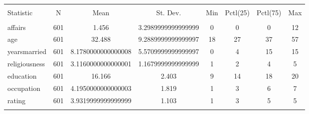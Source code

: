 
\begin{table}[!htbp] \centering 
  \caption{} 
  \label{} 
\begin{tabular}{@{\extracolsep{5pt}}lccccccc} 
\\[-1.8ex]\hline 
\hline \\[-1.8ex] 
Statistic & \multicolumn{1}{c}{N} & \multicolumn{1}{c}{Mean} & \multicolumn{1}{c}{St. Dev.} & \multicolumn{1}{c}{Min} & \multicolumn{1}{c}{Pctl(25)} & \multicolumn{1}{c}{Pctl(75)} & \multicolumn{1}{c}{Max} \\ 
\hline \\[-1.8ex] 
affairs & 601 & 1.456 & 3.2989999999999999 & 0 & 0 & 0 & 12 \\ 
age & 601 & 32.488 & 9.2889999999999997 & 18 & 27 & 37 & 57 \\ 
yearsmarried & 601 & 8.1780000000000008 & 5.5709999999999997 & 0 & 4 & 15 & 15 \\ 
religiousness & 601 & 3.1160000000000001 & 1.1679999999999999 & 1 & 2 & 4 & 5 \\ 
education & 601 & 16.166 & 2.403 & 9 & 14 & 18 & 20 \\ 
occupation & 601 & 4.1950000000000003 & 1.819 & 1 & 3 & 6 & 7 \\ 
rating & 601 & 3.9319999999999999 & 1.103 & 1 & 3 & 5 & 5 \\ 
\hline \\[-1.8ex] 
\end{tabular} 
\end{table} 
